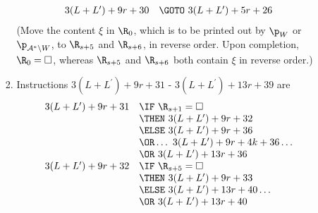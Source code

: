\begin{enumerate}[1.]
\begin{enumerate}[(a)]
\begin{enumerate}[(1)]
\[\begin{array}{rl}
3(L + L^\prime) + 9r + 30 & \GOTO \ 3(L + L^\prime) + 5r + 26
\end{array}
\]
(Move the content $\xi$ in $\R_0$, which is to be printed out by $\p_W$ or $\p_{\mathcal{A}^\ast \setminus W}$, to $\R_{s + 5}$ and $\R_{s + 6}$, in reverse order. Upon completion, $\R_0 = \Box$, whereas $\R_{s + 5}$ and $\R_{s + 6}$ both contain $\xi$ in reverse order.)
\item Instructions $3(L + L^\prime) + 9r + 31$ - $3(L + L^\prime) + 13r + 39$ are
\[
\begin{array}{rl}
3(L + L^\prime) + 9r + 31 & \IF \ \R_{s + 1} = \Box \cr
\ & \THEN \ 3(L + L^\prime) + 9r + 32 \cr
\ & \ELSE \ 3(L + L^\prime) + 9r + 36 \cr
\ & \OR \ldots \ 3(L + L^\prime) + 9r + 4k + 36 \ldots \cr
\ & \OR \ 3(L + L^\prime) + 13r + 36 \cr
3(L + L^\prime) + 9r + 32 & \IF \ \R_{s + 5} = \Box \cr
\ & \THEN \ 3(L + L^\prime) + 9r + 33 \cr
\ & \ELSE \ 3(L + L^\prime) + 13r + 40 \ldots \cr
\ & \OR \ 3(L + L^\prime) + 13r + 40 \cr


\end{array}\]
\end{enumerate}
\end{enumerate}
\end{enumerate}
